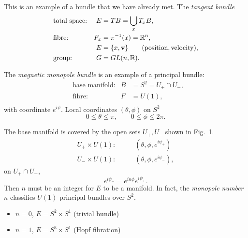 \begin{example}
  This is an example of a bundle that we have already met. The \emph{tangent bundle}
  \begin{align}
    &\text{total space:} & E &= TB = \bigcup_{x} T_x B, \\
    &\text{fibre:} & F_x &= \pi^{-1}(x) = \mathbb{R}^n, \\
    & & E &= \{x, \vb{v}\} \qquad (\text{position}, \text{velocity}), \\
    &\text{group:} & G &= GL(n, \mathbb{R}).
  \end{align}
\end{example}
\begin{example}
  The \emph{magnetic monopole bundle} is an example of a principal bundle:
  \begin{align}
    &\text{base manifold:} & B &= S^2 = U_+ \cap U_-, \\
    &\text{fibre:} & F &= U(1), \\
  \end{align}
  with coordinate $e^{i \psi}$. Local coordinates $(\theta, \phi)$ on $S^2$
  \begin{equation}
    0 \leq \theta \leq \pi, \qquad 0 \leq \phi \leq 2\pi.
  \end{equation}
  \begin{figure}[tbhp]
    \centering
    \caption{}
    \label{fig:l14f2}
  \end{figure}
  The base manifold is covered by the open sets $U_+, U_-$ shown in Fig.~\ref{fig:l14f2}.
  \begin{align}
    U_+ \times U(1):& \qquad (\theta, \phi, e^{i \psi_+}) \\
    U_- \times U(1):& \qquad (\theta, \phi, e^{i \psi_-}),
  \end{align}
  on $U_+ \cap U_-$, 
  \begin{equation}
    e^{i \psi_-} = e^{i n \phi} e^{i \psi_+}.
  \end{equation}
  Then $n$ must be an integer for $E$ to be a manifold.
  In fact, the \emph{monopole number} $n$ classifies $U(1)$ principal bundles over $S^2$.
  \begin{itemize}
    \item $n = 0$, $E = S^2 \times S^1$ (trivial bundle)
    \item $n = 1$, $E = S^3 \times S^1$ (Hopf fibration)
  \end{itemize}
\end{example}

